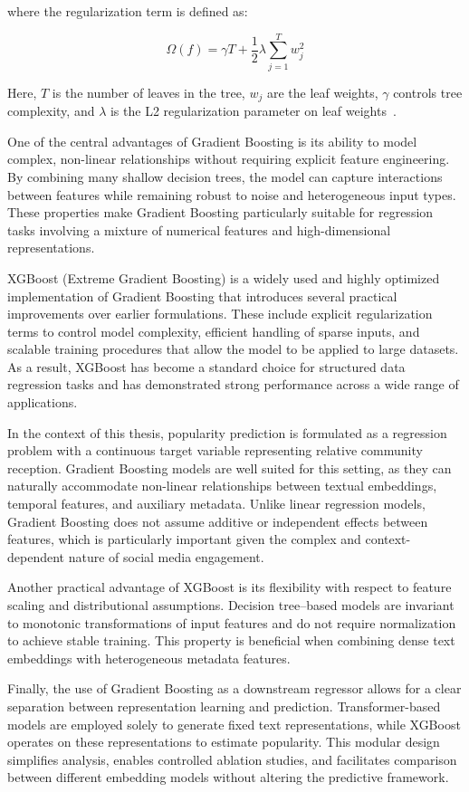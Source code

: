 where the regularization term is defined as:

\begin{equation}
\Omega(f) = \gamma T + \frac{1}{2}\lambda \sum_{j=1}^{T} w_j^2
\end{equation}

Here, $T$ is the number of leaves in the tree, $w_j$ are the leaf weights, $\gamma$ controls tree complexity, and $\lambda$ is the L2 regularization parameter on leaf weights~\cite{chen2016xgboost}.

One of the central advantages of Gradient Boosting is its ability to model complex, non-linear relationships without requiring explicit feature engineering. By combining many shallow decision trees, the model can capture interactions between features while remaining robust to noise and heterogeneous input types. These properties make Gradient Boosting particularly suitable for regression tasks involving a mixture of numerical features and high-dimensional representations.

XGBoost (Extreme Gradient Boosting)\cite{chen2016xgboost} is a widely used and highly optimized implementation of Gradient Boosting that introduces several practical improvements over earlier formulations. These include explicit regularization terms to control model complexity, efficient handling of sparse inputs, and scalable training procedures that allow the model to be applied to large datasets. As a result, XGBoost has become a standard choice for structured data regression tasks and has demonstrated strong performance across a wide range of applications.

In the context of this thesis, popularity prediction is formulated as a regression problem with a continuous target variable representing relative community reception. Gradient Boosting models are well suited for this setting, as they can naturally accommodate non-linear relationships between textual embeddings, temporal features, and auxiliary metadata. Unlike linear regression models, Gradient Boosting does not assume additive or independent effects between features, which is particularly important given the complex and context-dependent nature of social media engagement.

Another practical advantage of XGBoost is its flexibility with respect to feature scaling and distributional assumptions. Decision tree–based models are invariant to monotonic transformations of input features and do not require normalization to achieve stable training. This property is beneficial when combining dense text embeddings with heterogeneous metadata features.

Finally, the use of Gradient Boosting as a downstream regressor allows for a clear separation between representation learning and prediction. Transformer-based models are employed solely to generate fixed text representations, while XGBoost operates on these representations to estimate popularity. This modular design simplifies analysis, enables controlled ablation studies, and facilitates comparison between different embedding models without altering the predictive framework.